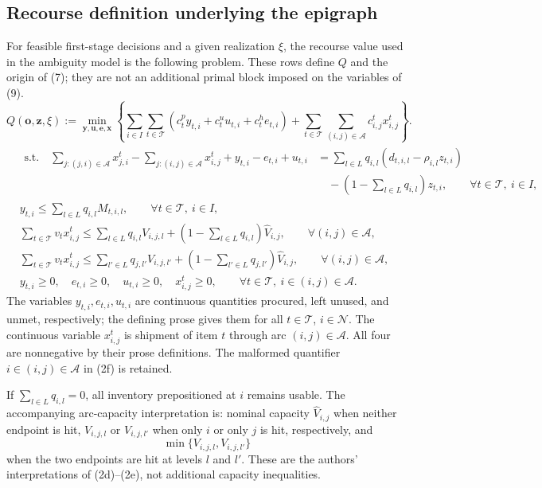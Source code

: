 \documentclass{article}
\begin{document}
\subsection*{Recourse definition underlying the epigraph}
For feasible first-stage decisions and a given realization $\xi$, the recourse value
used in the ambiguity model is the following problem. These rows define $Q$ and the
origin of (7); they are not an additional primal block imposed on the variables of
(9).
\begin{equation}
Q(\boldsymbol o,\boldsymbol z,\xi):=
\min_{\boldsymbol y,\boldsymbol u,\boldsymbol e,\boldsymbol x}
\left\{\sum_{i\in I}\sum_{t\in\mathcal T}
(c_t^p y_{t,i}+c_t^u u_{t,i}+c_t^h e_{t,i})
+\sum_{t\in\mathcal T}\sum_{(i,j)\in\mathcal A}c^t_{i,j}x^t_{i,j}\right\}.
\tag{2a}
\end{equation}
\begin{align}
&\begin{aligned}
\text{s.t.}\quad
\sum_{j:(j,i)\in\mathcal A}x^t_{j,i}
-\sum_{j:(i,j)\in\mathcal A}x^t_{i,j}
+y_{t,i}-e_{t,i}+u_{t,i}
&=\sum_{l\in L}q_{i,l}(d_{t,i,l}-\rho_{i,l}z_{t,i})\\
&\quad-\left(1-\sum_{l\in L}q_{i,l}\right)z_{t,i},
\qquad\forall t\in\mathcal T,\ i\in I,
\end{aligned}\tag{2b}\\
&y_{t,i}\leq\sum_{l\in L}q_{i,l}M_{t,i,l},
\qquad\forall t\in\mathcal T,\ i\in I,\tag{2c}\\
&\sum_{t\in\mathcal T}v_t x^t_{i,j}
\leq\sum_{l\in L}q_{i,l}V_{i,j,l}
+\left(1-\sum_{l\in L}q_{i,l}\right)\hat V_{i,j},
\qquad\forall(i,j)\in\mathcal A,\tag{2d}\\
&\sum_{t\in\mathcal T}v_t x^t_{i,j}
\leq\sum_{l'\in L}q_{j,l'}V_{i,j,l'}
+\left(1-\sum_{l'\in L}q_{j,l'}\right)\hat V_{i,j},
\qquad\forall(i,j)\in\mathcal A,\tag{2e}\\
&y_{t,i}\geq0,\quad e_{t,i}\geq0,\quad u_{t,i}\geq0,\quad x^t_{i,j}\geq0,
\qquad\forall t\in\mathcal T,\ i\in(i,j)\in\mathcal A.\tag{2f}
\end{align}
The variables $y_{t,i},e_{t,i},u_{t,i}$ are continuous quantities procured, left unused,
and unmet, respectively; the defining prose gives them for all $t\in\mathcal T$,
$i\in\mathcal N$. The continuous variable $x^t_{i,j}$ is shipment of item $t$ through
arc $(i,j)\in\mathcal A$. All four are nonnegative by their prose definitions. The
malformed quantifier $i\in(i,j)\in\mathcal A$ in (2f) is retained.

If $\sum_{l\in L}q_{i,l}=0$, all inventory prepositioned at $i$ remains usable.
The accompanying arc-capacity interpretation is: nominal capacity $\hat V_{i,j}$
when neither endpoint is hit, $V_{i,j,l}$ or $V_{i,j,l'}$ when only $i$ or only $j$
is hit, respectively, and
\[
\min\{V_{i,j,l},V_{i,j,l'}\}
\]
when the two endpoints are hit at levels $l$ and $l'$. These are the authors'
interpretations of (2d)--(2e), not additional capacity inequalities.
\end{document}

